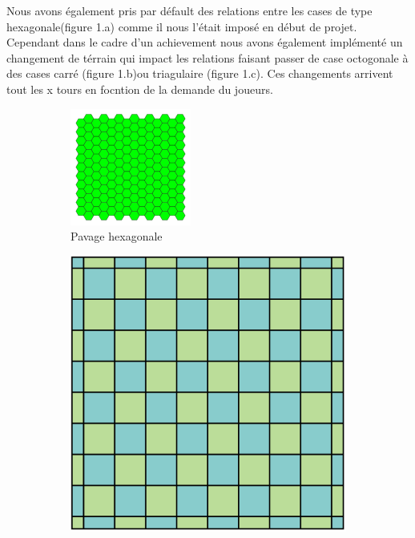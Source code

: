         
        Nous avons également pris par défault des relations entre les cases de type hexagonale(figure 1.a) comme il nous l'était imposé en début de projet. Cependant dans le cadre d'un achievement nous avons également implémenté un changement de térrain qui impact les relations faisant passer de case octogonale à des cases carré (figure 1.b)ou triagulaire (figure 1.c). Ces changements arrivent tout les x tours en focntion de la demande du joueurs.
\begin{figure}[htbp]
\centering
\begin{subfigure}{0.3\textwidth}
\centering
\includegraphics[width=\textwidth]{plateauhexa.png}
\caption{Pavage hexagonale}
\label{label_de_l_image_1}
\end{subfigure}
\quad
\begin{subfigure}{0.3\textwidth}
\centering
\includegraphics[width=\textwidth]{quadrillage.png}

\end{subfigure}
\end{figure}
